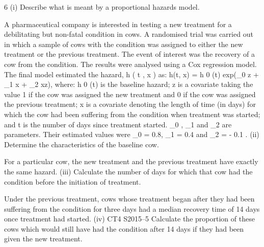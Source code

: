 6
(i)
Describe what is meant by a proportional hazards model.

A pharmaceutical company is interested in testing a new treatment for a debilitating
but non-fatal condition in cows. A randomised trial was carried out in which a sample
of cows with the condition was assigned to either the new treatment or the previous
treatment. The event of interest was the recovery of a cow from the condition. The
results were analysed using a Cox regression model.
The final model estimated the hazard, h ( t , x ) as:
h(t, x) = h 0 (t) exp(\beta_0 z + \beta_1 x + \beta_2 xz),
where:
h 0 (t) is the baseline hazard;
z is a covariate taking the value 1 if the cow was assigned the new treatment and 0 if
the cow was assigned the previous treatment;
x is a covariate denoting the length of time (in days) for which the cow had been
suffering from the condition when treatment was started;
and t is the number of days since treatment started.
\beta_0 , \beta_1 and \beta_2 are parameters. Their estimated values were \beta_0 = 0.8, \beta_1 = 0.4
and \beta_2 = - 0.1 .
(ii)
Determine the characteristics of the baseline cow.

For a particular cow, the new treatment and the previous treatment have exactly the
same hazard.
(iii)
Calculate the number of days for which that cow had the condition before the
initiation of treatment.

Under the previous treatment, cows whose treatment began after they had been
suffering from the condition for three days had a median recovery time of 14 days
once treatment had started.
(iv)
CT4 S2015–5
Calculate the proportion of these cows which would still have had the
condition after 14 days if they had been given the new treatment.

